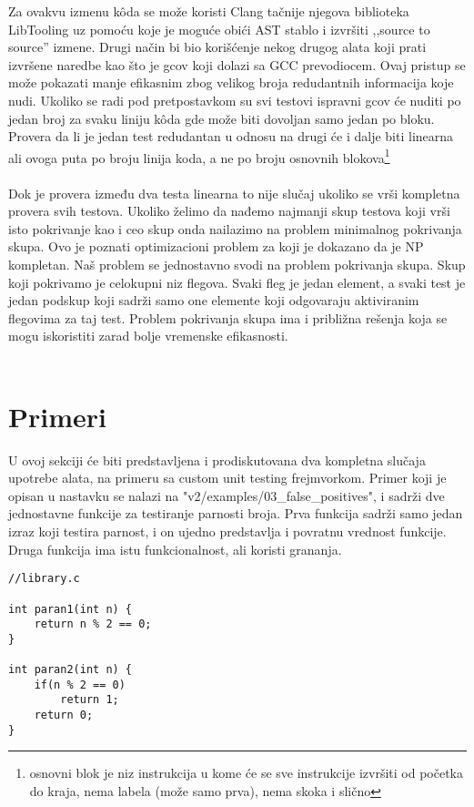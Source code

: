 \documentclass[a4paper]{article}
\begin{document}
Za ovakvu izmenu kôda se može koristi Clang tačnije njegova biblioteka LibTooling uz pomoću koje je moguće obići AST stablo i izvršiti ,,source to source'' izmene. Drugi način bi bio korišćenje nekog drugog alata koji prati izvršene naredbe kao što je gcov koji dolazi sa GCC prevodiocem. Ovaj pristup se može pokazati manje efikasnim zbog velikog broja redudantnih informacija koje nudi. Ukoliko se radi pod pretpostavkom su svi testovi ispravni gcov će nuditi po jedan broj za svaku liniju kôda gde može biti dovoljan samo jedan po bloku. Provera da li je jedan test redudantan u odnosu na drugi će i dalje biti linearna ali ovoga puta po broju linija koda, a ne po broju osnovnih blokova\footnote{osnovni blok je niz instrukcija u kome će se sve instrukcije izvršiti od početka do kraja, nema labela (može samo prva), nema skoka i slično} \\\\
Dok je provera između dva testa linearna to nije slučaj ukoliko se vrši kompletna provera svih testova. Ukoliko želimo da nađemo najmanji skup testova koji vrši isto pokrivanje kao i ceo skup onda nailazimo na problem minimalnog pokrivanja skupa. Ovo je poznati optimizacioni problem za koji je dokazano da je NP kompletan. Naš problem se jednostavno svodi na problem pokrivanja skupa. Skup koji pokrivamo je celokupni niz flegova. Svaki fleg je jedan element, a svaki test je jedan podskup koji sadrži samo one elemente koji odgovaraju aktiviranim flegovima za taj test. Problem pokrivanja skupa ima i približna rešenja koja se mogu iskoristiti zarad bolje vremenske efikasnosti. \\\\


\section{Primeri}
\label{sec:examples}
U ovoj sekciji će biti predstavljena i prodiskutovana dva kompletna slučaja upotrebe alata, na primeru sa custom unit testing frejmvorkom. Primer koji je opisan u nastavku se nalazi na "v2/examples/03\_false\_positives", i sadrži dve jednostavne funkcije za testiranje parnosti broja. Prva funkcija sadrži samo jedan izraz koji testira parnost, i on ujedno predstavlja i povratnu vrednost funkcije. Druga funkcija ima istu funkcionalnost, ali koristi grananja.

\begin{lstlisting}
//library.c

int paran1(int n) {
    return n % 2 == 0;
}

int paran2(int n) {
    if(n % 2 == 0)
        return 1;
    return 0;
}
\end{lstlisting}
\end{document}
